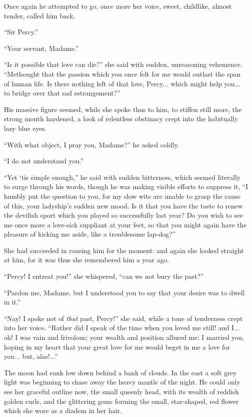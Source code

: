 \documentclass[paper=a5,BCOR=7mm,twoside,DIV=calc,12pt,usegeometry,chapterprefix,endperiod,headings=big]{scrbook}
\begin{document}
Once again he attempted to go, once more her voice, sweet, childlike, almost tender, called him back.

\enquote{Sir Percy.}

\enquote{Your servant, Madame.}

\enquote{Is it possible that love can die?} she said with sudden, unreasoning vehemence. \enquote{Methought that the passion which you once felt for me would outlast the span of human life. Is there nothing left of that love, Percy... which might help you... to bridge over that sad estrangement?}

His massive figure seemed, while she spoke thus to him, to stiffen still more, the strong mouth hardened, a look of relentless obstinacy crept into the habitually lazy blue eyes.

\enquote{With what object, I pray you, Madame?} he asked coldly.

\enquote{I do not understand you.}

\enquote{Yet `tis simple enough,} he said with sudden bitterness, which seemed literally to surge through his words, though he was making visible efforts to suppress it, \enquote{I humbly put the question to you, for my slow wits are unable to grasp the cause of this, your ladyship's sudden new mood. Is it that you have the taste to renew the devilish sport which you played so successfully last year? Do you wish to see me once more a love-sick suppliant at your feet, so that you might again have the pleasure of kicking me aside, like a troublesome lap-dog?}

She had succeeded in rousing him for the moment: and again she looked straight at him, for it was thus she remembered him a year ago.

\enquote{Percy! I entreat you!} she whispered, \enquote{can we not bury the past?}

\enquote{Pardon me, Madame, but I understood you to say that your desire was to dwell in it.}

\enquote{Nay! I spoke not of \textit{that} past, Percy!} she said, while a tone of tenderness crept into her voice. \enquote{Rather did I speak of the time when you loved me still! and I... oh! I was vain and frivolous; your wealth and position allured me: I married you, hoping in my heart that your great love for me would beget in me a love for you... but, alas!...}

The moon had sunk low down behind a bank of clouds. In the east a soft grey light was beginning to chase away the heavy mantle of the night. He could only see her graceful outline now, the small queenly head, with its wealth of reddish golden curls, and the glittering gems forming the small, star-shaped, red flower which she wore as a diadem in her hair.
\end{document}
